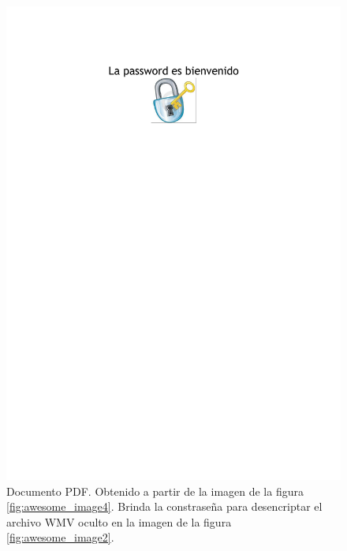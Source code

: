 \documentclass[a4paper,10pt]{article}
\begin{document}
\begin{figure}[!htb]
\begin{center}
%
 \includegraphics[scale=0.25]{./images/loimposible-out.pdf}
  \caption{Documento PDF. Obtenido a partir de la imagen de la figura \ref{fig:awesome_image4}. Brinda la constraseña para desencriptar el archivo 
    WMV oculto en la imagen de la figura \ref{fig:awesome_image2}.}\label{fig:awesome_image6}
\endminipage
\end{center}
\end{figure}
\end{document}
